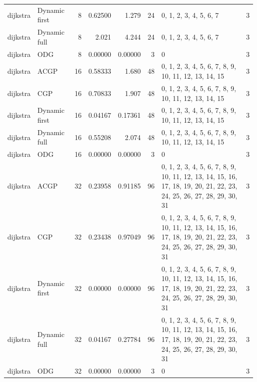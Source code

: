\documentclass[10pt,a4paper]{article}
\begin{document}
\begin{longtable}{@{}p{23mm}p{29mm}rrrrp{36mm}r@{}}
dijkstra & Dynamic first & 8 & 0.62500 & 1.279 & 24 & 0, 1, 2, 3, 4, 5, 6, 7 & 3 \\
dijkstra & Dynamic full & 8 & 2.021 & 4.244 & 24 & 0, 1, 2, 3, 4, 5, 6, 7 & 3 \\
dijkstra & ODG & 8 & 0.00000 & 0.00000 & 3 & 0 & 3 \\
dijkstra & ACGP & 16 & 0.58333 & 1.680 & 48 & 0, 1, 2, 3, 4, 5, 6, 7, 8, 9, 10, 11, 12, 13, 14, 15 & 3 \\
dijkstra & CGP & 16 & 0.70833 & 1.907 & 48 & 0, 1, 2, 3, 4, 5, 6, 7, 8, 9, 10, 11, 12, 13, 14, 15 & 3 \\
dijkstra & Dynamic first & 16 & 0.04167 & 0.17361 & 48 & 0, 1, 2, 3, 4, 5, 6, 7, 8, 9, 10, 11, 12, 13, 14, 15 & 3 \\
dijkstra & Dynamic full & 16 & 0.55208 & 2.074 & 48 & 0, 1, 2, 3, 4, 5, 6, 7, 8, 9, 10, 11, 12, 13, 14, 15 & 3 \\
dijkstra & ODG & 16 & 0.00000 & 0.00000 & 3 & 0 & 3 \\
dijkstra & ACGP & 32 & 0.23958 & 0.91185 & 96 & 0, 1, 2, 3, 4, 5, 6, 7, 8, 9, 10, 11, 12, 13, 14, 15, 16, 17, 18, 19, 20, 21, 22, 23, 24, 25, 26, 27, 28, 29, 30, 31 & 3 \\
dijkstra & CGP & 32 & 0.23438 & 0.97049 & 96 & 0, 1, 2, 3, 4, 5, 6, 7, 8, 9, 10, 11, 12, 13, 14, 15, 16, 17, 18, 19, 20, 21, 22, 23, 24, 25, 26, 27, 28, 29, 30, 31 & 3 \\
dijkstra & Dynamic first & 32 & 0.00000 & 0.00000 & 96 & 0, 1, 2, 3, 4, 5, 6, 7, 8, 9, 10, 11, 12, 13, 14, 15, 16, 17, 18, 19, 20, 21, 22, 23, 24, 25, 26, 27, 28, 29, 30, 31 & 3 \\
dijkstra & Dynamic full & 32 & 0.04167 & 0.27784 & 96 & 0, 1, 2, 3, 4, 5, 6, 7, 8, 9, 10, 11, 12, 13, 14, 15, 16, 17, 18, 19, 20, 21, 22, 23, 24, 25, 26, 27, 28, 29, 30, 31 & 3 \\
dijkstra & ODG & 32 & 0.00000 & 0.00000 & 3 & 0 & 3 \\
\end{longtable}\normalsize\setlength{\tabcolsep}{6pt}
\clearpage
\end{document}
